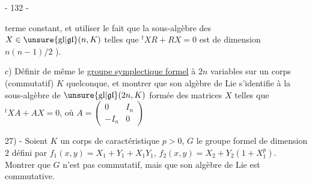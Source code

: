 \begin{center}- 132 -\end{center}

terme constant, et utiliser le fait que la sous-algèbre des $X\in\unsure{\mathrm{gl}|\mathfrak{gl}}(n,K)$ telles que ${}^tXR+RX=0$ est de dimension $n(n-1)/2$ ).

c) Définir de même le \uline{groupe symplectique formel} à $2n$ variables sur un corps (commutatif) $K$ quelconque, et montrer que son algèbre de Lie s'identifie à la sous-algèbre de $\unsure{\mathrm{gl}|\mathfrak{gl}}(2n,K)$ formée des matrices $X$ telles que ${}^tXA+AX=0$, où $A=\begin{pmatrix}0&I_n\\-I_n&0\end{pmatrix}$

27) - Soient $K$ un corps de caractéristique $p>0$, $G$ le groupe formel de dimension $2$ défini par $f_1(x,y)=X_1+Y_1+X_1Y_1$, $f_2(x,y)=X_2+Y_2(1+X_1^p)$. Montrer que $G$ n'est pas commutatif, mais que son algèbre de Lie est commutative.
